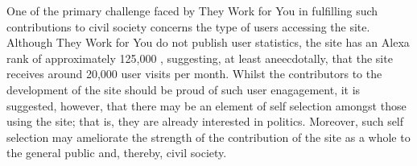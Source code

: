One of the primary challenge faced by They Work for You in fulfilling such contributions to civil society concerns the type of users accessing the site.
Although They Work for You do not publish user statistics, the site has an Alexa rank of approximately 125,000 \cite{alexa-rank}, suggesting, at least aneecdotally, that the site receives around 20,000 user visits per month.
Whilst the contributors to the development of the site should be proud of such user enagagement, it is suggested, however, that there may be an element of self selection amongst those using the site; that is, they are already interested in politics.
Moreover, such self selection may ameliorate the strength of the contribution of the site as a whole to the general public and, thereby, civil society.